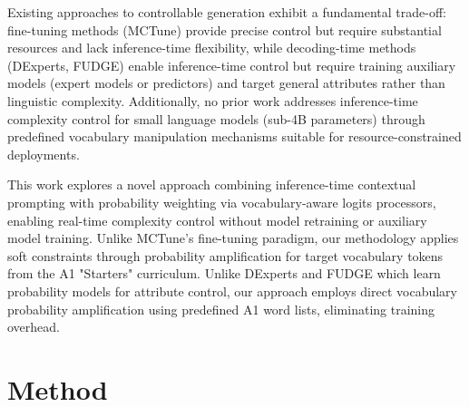 \documentclass[10pt, a4paper]{article}
\begin{document}
Existing approaches to controllable generation exhibit a fundamental trade-off: fine-tuning methods (MCTune) provide precise control but require substantial resources and lack inference-time flexibility, while decoding-time methods (DExperts, FUDGE) enable inference-time control but require training auxiliary models (expert models or predictors) and target general attributes rather than linguistic complexity. Additionally, no prior work addresses inference-time complexity control for small language models (sub-4B parameters) through predefined vocabulary manipulation mechanisms suitable for resource-constrained deployments.

This work explores a novel approach combining inference-time contextual prompting with probability weighting via vocabulary-aware logits processors, enabling real-time complexity control without model retraining or auxiliary model training. Unlike MCTune's fine-tuning paradigm, our methodology applies soft constraints through probability amplification for target vocabulary tokens from the A1 "Starters" curriculum. Unlike DExperts and FUDGE which learn probability models for attribute control, our approach employs direct vocabulary probability amplification using predefined A1 word lists, eliminating training overhead.


\section{Method}
\end{document}
